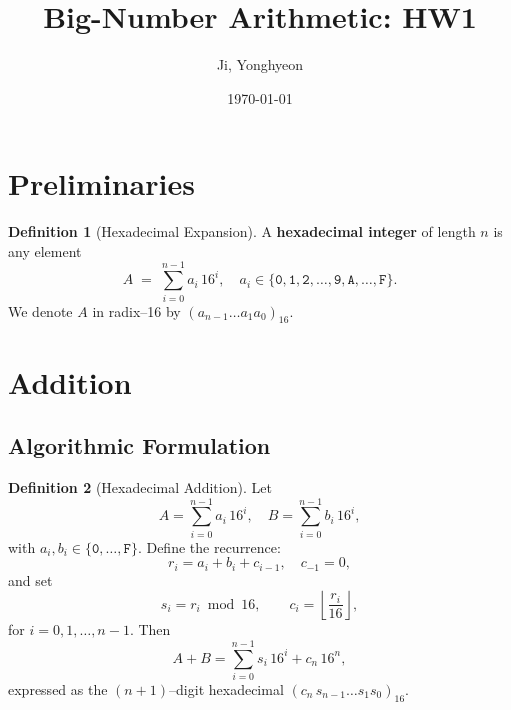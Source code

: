 \documentclass[11pt,a4paper]{article}
\title{Big-Number Arithmetic: HW1}
\author{Ji, Yonghyeon}
\date{\today}
\theoremstyle{definition}
\newtheorem{definition}{Definition}[section]
\theoremstyle{remark}
\renewcommand{\emph}[1]{\textbf{#1}}
\begin{document}
\maketitle
\tableofcontents
\newpage
\section{Preliminaries}
\begin{definition}[Hexadecimal Expansion]
	A \emph{hexadecimal integer} of length $n$ is any element
	\[
	A \;=\;\sum_{i=0}^{n-1} a_i\,16^i,\quad a_i\in\{\texttt{0},\texttt{1},\texttt{2},\dots,\texttt{9},\texttt{A},\dots,\texttt{F}\}.
	\]
	We denote $A$ in radix--16 by $(a_{n-1}\dots a_1 a_0)_{16}$.
\end{definition}

\section{Addition}
\subsection{Algorithmic Formulation}
\begin{definition}[Hexadecimal Addition]
	Let \[
	A=\sum_{i=0}^{n-1} a_i\,16^i,\quad B=\sum_{i=0}^{n-1} b_i\,16^i,
	\] with $a_i,b_i\in\{\texttt{0},\dots,\texttt{F}\}$.  Define the recurrence: \[
	r_i= a_i + b_i + c_{i-1},\quad c_{-1}=0,
	\] and set \[
	s_i = r_i\bmod 16,\qquad c_i = \left\lfloor\frac{r_i}{16}\right\rfloor,
	\] for $i=0,1,\dots,n-1$.  Then \[
	A+B = \sum_{i=0}^{n-1} s_i\,16^i + c_n\,16^{n},
	\]
	expressed as the $(n+1)$--digit hexadecimal
	$(c_n\, s_{n-1}\dots s_1 s_0)_{16}$.
\end{definition}
\vfill
\end{document}
